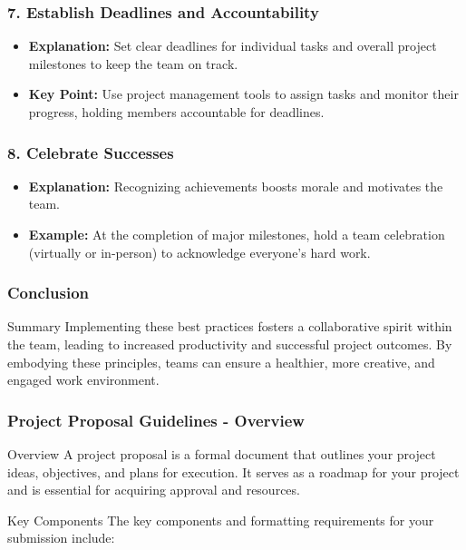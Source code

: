 \documentclass[aspectratio=169]{beamer}
\begin{document}
\begin{frame}[fragile]
    \frametitle{7. Establish Deadlines and Accountability}
    \begin{itemize}
        \item \textbf{Explanation:} Set clear deadlines for individual tasks and overall project milestones to keep the team on track.
        \item \textbf{Key Point:} Use project management tools to assign tasks and monitor their progress, holding members accountable for deadlines.
    \end{itemize}
\end{frame}

\begin{frame}[fragile]
    \frametitle{8. Celebrate Successes}
    \begin{itemize}
        \item \textbf{Explanation:} Recognizing achievements boosts morale and motivates the team.
        \item \textbf{Example:} At the completion of major milestones, hold a team celebration (virtually or in-person) to acknowledge everyone's hard work.
    \end{itemize}
\end{frame}

\begin{frame}[fragile]
    \frametitle{Conclusion}
    \begin{block}{Summary}
        Implementing these best practices fosters a collaborative spirit within the team, leading to increased productivity and successful project outcomes. 
        By embodying these principles, teams can ensure a healthier, more creative, and engaged work environment.
    \end{block}
\end{frame}

\begin{frame}[fragile]
  \frametitle{Project Proposal Guidelines - Overview}
  \begin{block}{Overview}
    A project proposal is a formal document that outlines your project ideas, objectives, and plans for execution. 
    It serves as a roadmap for your project and is essential for acquiring approval and resources. 
  \end{block}
  \begin{block}{Key Components}
    The key components and formatting requirements for your submission include:
  \end{block}
\end{frame}
\end{document}
